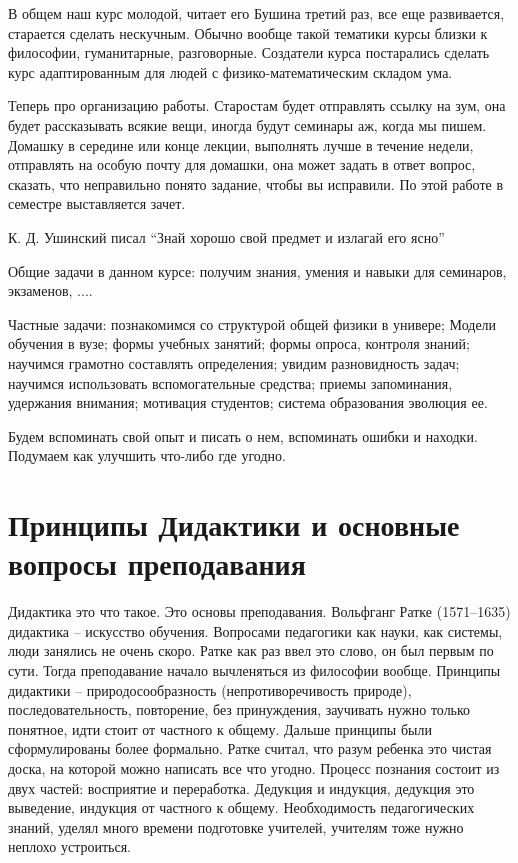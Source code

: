 \documentclass[a4paper, 12pt]{article}
\begin{document}
В общем наш курс молодой, читает его Бушина третий раз, все еще 
развивается, старается сделать нескучным. Обычно вообще такой тематики 
курсы близки к философии, гуманитарные, разговорные. Создатели курса 
постарались сделать курс адаптированным для людей 
с физико-математическим складом ума.

Теперь про организацию работы. Старостам будет отправлять ссылку на зум, 
она будет рассказывать всякие вещи, иногда будут семинары аж, когда мы 
пишем. Домашку в середине или конце лекции, выполнять лучше в течение 
недели, отправлять на особую почту для домашки, она может задать в ответ 
вопрос, сказать, что неправильно понято задание, чтобы вы исправили. По 
этой работе в семестре выставляется зачет.

К. Д. Ушинский писал ``Знай хорошо свой предмет и излагай его ясно''

Общие задачи в данном курсе: получим знания, умения и навыки для 
семинаров, экзаменов, ....

Частные задачи: познакомимся со структурой общей физики в универе; 
Модели обучения в вузе; формы учебных занятий; формы опроса, контроля 
знаний; научимся грамотно составлять определения; увидим разновидность 
задач; научимся использовать вспомогательные средства; приемы 
запоминания, удержания внимания; мотивация студентов; система 
образования эволюция ее.

Будем вспоминать свой опыт и писать о нем, вспоминать ошибки и находки. 
Подумаем как улучшить что-либо где угодно.


\section{Принципы Дидактики и основные вопросы преподавания}

Дидактика это что такое. Это основы преподавания. Вольфганг Ратке 
(1571--1635) дидактика -- искусство обучения. Вопросами педагогики как 
науки, как системы, люди занялись не очень скоро. Ратке как раз ввел это 
слово, он был первым по сути. Тогда преподавание начало вычленяться из 
философии вообще. Принципы дидактики -- природосообразность 
(непротиворечивость природе), последовательность, повторение, без 
принуждения, заучивать нужно только понятное, идти стоит от частного 
к общему. Дальше принципы были сформулированы более формально. Ратке 
считал, что разум ребенка это чистая доска, на которой можно написать 
все что угодно. Процесс познания состоит из двух частей: восприятие 
и переработка. Дедукция и индукция, дедукция это выведение, индукция от 
частного к общему. Необходимость педагогических знаний, уделял много 
времени подготовке учителей, учителям тоже нужно неплохо устроиться.
\end{document}
